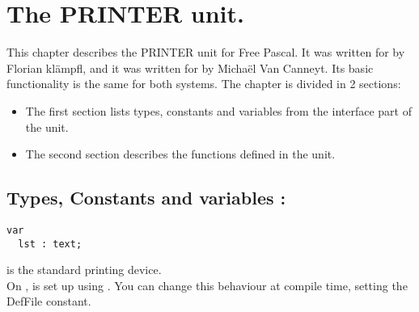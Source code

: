 %
%
%
%
%
\chapter{The PRINTER unit.}
This chapter describes the PRINTER unit for Free Pascal. It was written for
\dos by Florian kl\"ampfl, and 
it was written for \linux by Micha\"el Van Canneyt. Its basic functionality
is the same for both systems.
The chapter is divided in 2 sections:
\begin{itemize}
\item The first section lists types, constants and variables from the
interface part of the unit.
\item The second section describes the functions defined in the unit.
\end{itemize}
\section {Types, Constants and variables : }
\begin{verbatim}
var 
  lst : text;
\end{verbatim}
 is the standard printing device. \\ On \linux, 
 is set up using . 
You can change this behaviour at compile time, setting the DefFile constant.
